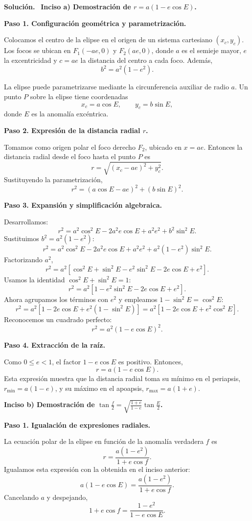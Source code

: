 \documentclass[11pt]{article}
\theoremstyle{prismstyle}
\newenvironment{solution}[1][Solución]
  {\par\textbf{#1.}\ }
  {\par}
\begin{document}
\begin{solution}
\textbf{Inciso a) Demostración de $r = a(1 - e\cos E)$.}

\textbf{Paso 1. Configuración geométrica y parametrización.}

Colocamos el centro de la elipse en el origen de un sistema cartesiano $(x_c,y_c)$. Los focos se ubican en $F_1(-ae,0)$ y $F_2(ae,0)$, donde $a$ es el semieje mayor, $e$ la excentricidad y $c=ae$ la distancia del centro a cada foco. Además,
\[
b^2 = a^2(1-e^2).
\]

La elipse puede parametrizarse mediante la circunferencia auxiliar de radio $a$. Un punto $P$ sobre la elipse tiene coordenadas
\[
x_c = a\cos E,
\qquad
y_c = b\sin E,
\]
donde $E$ es la anomalía excéntrica.

\textbf{Paso 2. Expresión de la distancia radial $r$.}

Tomamos como origen polar el foco derecho $F_2$, ubicado en $x=ae$. Entonces la distancia radial desde el foco hasta el punto $P$ es
\[
r = \sqrt{(x_c-ae)^2 + y_c^2}.
\]
Sustituyendo la parametrización,
\[
r^2 = (a\cos E-ae)^2 + (b\sin E)^2.
\]

\textbf{Paso 3. Expansión y simplificación algebraica.}

Desarrollamos:
\[
r^2 = a^2\cos^2 E - 2a^2e\cos E + a^2e^2 + b^2\sin^2 E.
\]
Sustituimos $b^2 = a^2(1-e^2)$:
\[
r^2 = a^2\cos^2 E - 2a^2e\cos E + a^2e^2 + a^2(1-e^2)\sin^2 E.
\]
Factorizando $a^2$,
\[
r^2 = a^2\left[\cos^2 E + \sin^2 E - e^2\sin^2 E - 2e\cos E + e^2\right].
\]
Usamos la identidad $\cos^2 E + \sin^2 E = 1$:
\[
r^2 = a^2\left[1 - e^2\sin^2 E - 2e\cos E + e^2\right].
\]
Ahora agrupamos los términos con $e^2$ y empleamos $1-\sin^2 E = \cos^2 E$:
\[
r^2 = a^2\left[1 - 2e\cos E + e^2(1-\sin^2 E)\right]
= a^2\left[1 - 2e\cos E + e^2\cos^2 E\right].
\]
Reconocemos un cuadrado perfecto:
\[
r^2 = a^2(1-e\cos E)^2.
\]

\textbf{Paso 4. Extracción de la raíz.}

Como $0 \le e < 1$, el factor $1-e\cos E$ es positivo. Entonces,
\[
\boxed{r = a(1-e\cos E)}.
\]
Esta expresión muestra que la distancia radial toma su mínimo en el periapsis, $r_{\min}=a(1-e)$, y su máximo en el apoapsis, $r_{\max}=a(1+e)$.

\textbf{Inciso b) Demostración de $\tan\frac{f}{2} = \sqrt{\frac{1+e}{1-e}}\tan\frac{E}{2}$.}

\textbf{Paso 1. Igualación de expresiones radiales.}

La ecuación polar de la elipse en función de la anomalía verdadera $f$ es
\[
r = \frac{a(1-e^2)}{1+e\cos f}.
\]
Igualamos esta expresión con la obtenida en el inciso anterior:
\[
a(1-e\cos E) = \frac{a(1-e^2)}{1+e\cos f}.
\]
Cancelando $a$ y despejando,
\[
1+e\cos f = \frac{1-e^2}{1-e\cos E}.
\]


\end{solution}
\end{document}

